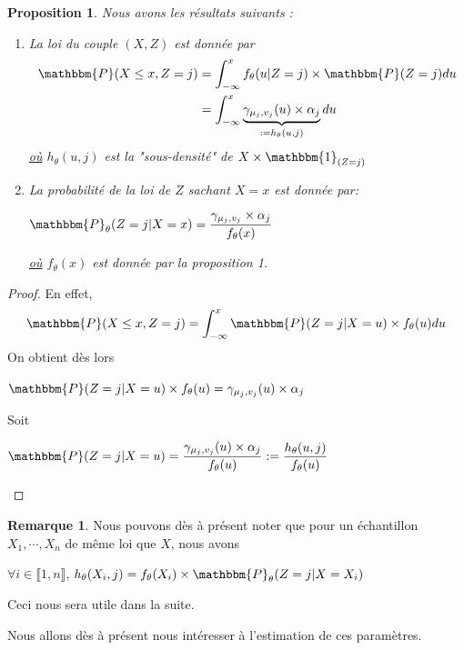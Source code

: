 \documentclass[frenchb]{report}
\newcommand{\1}{\mathbbm{1}}
\newcommand{\prob}{\mathbbm{P}}
\newtheorem{prop}{Proposition}
\theoremstyle{definition}\newtheorem{defn}{Définition}
\theoremstyle{definition}\newtheorem{exm}{Exemple}
\theoremstyle{definition}\newtheorem{nota}{Notation}
\theoremstyle{definition}\newtheorem{rem}{Remarque}
\begin{document}
\begin{prop} Nous avons les résultats suivants :
\begin{enumerate}
\item La loi du couple $(X,Z)$ est donnée par 
\begin{align*} 
\prob(X\leq x, Z = j) &= \displaystyle\int_{-\infty}^x f_\theta(u | Z = j)\times\prob(Z=j)du\\
&= \displaystyle\int_{-\infty}^x  \underbrace{\gamma_{\mu_j, v_j}(u) \times \alpha_j }_{:= h_\theta(u,j)}du
\end{align*}
\underline{où} $h_\theta(u,j)$ est la "sous-densité" de $X\times\1_{(Z=j)}$
\item La probabilité de la loi de $Z$ sachant $X=x$ est donnée par:
\begin{center} $\prob_\theta(Z = j | X = x)=\displaystyle \frac{\gamma_{\mu_j, v_j}\times\alpha_j}{f_\theta(x)}$ \end{center}
\underline{où} $f_\theta(x)$ est donnée par la proposition 1.
\end{enumerate}
\end{prop}

\begin{proof}
En effet, 
\begin{align*}
\prob(X\leq x, Z = j) = \displaystyle\int_{-\infty}^x \prob(Z = j | X = u) \times f_\theta(u) du
\end{align*}
On obtient dès lors
\begin{center}
$\prob(Z = j | X = u)\times f_\theta(u) = \gamma_{\mu_j, v_j}(u) \times \alpha_j$
\end{center}
Soit
\begin{center}
$\prob(Z = j | X = u) = \displaystyle\frac{\gamma_{\mu_j, v_j}(u)\times\alpha_j}{f_\theta(u)} := \frac{h_\theta(u,j)}{f_\theta(u)}$
\end{center}
\end{proof}

\begin{rem}
Nous pouvons dès à présent noter que pour un échantillon $X_1, \cdots, X_n$ de même loi que $X$, nous avons 
\begin{center}
$\forall i \in \llbracket 1,n \rrbracket$, $h_\theta(X_i,j) = f_\theta(X_i) \times \prob_\theta(Z = j | X = X_i )$
\end{center}
Ceci nous sera utile dans la suite.
\end{rem}

Nous allons dès à présent nous intéresser à l'estimation de ces paramètres.
\end{document}
